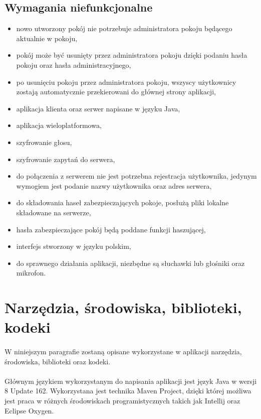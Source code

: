 \documentclass[12pt,a4paper,notitlepage]{report}
\begin{document}
	\subsection{Wymagania niefunkcjonalne}
	\begin{itemize}
		\item nowo utworzony pokój nie potrzebuje administratora pokoju będącego aktualnie w pokoju,
		\item pokój może być usunięty przez administratora pokoju dzięki podaniu hasła pokoju oraz hasła administracyjnego,
		\item po usunięciu pokoju przez administratora pokoju, wszyscy użytkownicy zostają automatycznie przekierowani do głównej strony aplikacji,
		\item aplikacja klienta oraz serwer napisane w języku Java,
		\item aplikacja wieloplatformowa,
		\item szyfrowanie głosu,
		\item szyfrowanie zapytań do serwera,
		\item do połączenia z serwerem nie jest potrzebna rejestracja użytkownika, jedynym wymogiem jest podanie nazwy użytkownika oraz adres serwera,
		\item do składowania haseł zabezpieczających pokoje, posłużą pliki lokalne składowane na serwerze,
		\item hasła zabezpieczające pokój będą poddane funkcji haszującej,
		\item interfejs stworzony w języku polskim,
		\item do sprawnego działania aplikacji, niezbędne są słuchawki lub głośniki oraz mikrofon.
	\end{itemize}
	\section{Narzędzia, środowiska, biblioteki, kodeki}
	\paragraph*{} W niniejszym paragrafie zostaną opisane wykorzystane w aplikacji narzędzia, środowiska, biblioteki oraz kodeki.
	\paragraph*{} Głównym językiem wykorzystanym do napisania aplikacji jest język Java w wersji 8 Update 162. Wykorzystana jest technika Maven Project, dzięki której możliwa jest praca w różnych środowiskach programistycznych takich jak Intellij oraz Eclipse Oxygen.
\end{document}
